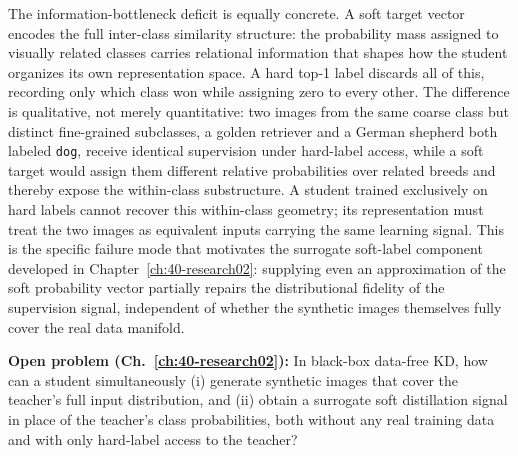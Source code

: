 \begin{foldable}
  The information-bottleneck deficit is equally concrete.
  A soft target vector encodes the full inter-class similarity structure: the probability mass assigned to visually related classes carries relational information that shapes how the student organizes its own representation space.
  A hard top-1 label discards all of this, recording only which class won while assigning zero to every other.
  The difference is qualitative, not merely quantitative: two images from the same coarse class but distinct fine-grained subclasses, a golden retriever and a German shepherd both labeled \texttt{dog}, receive identical supervision under hard-label access, while a soft target would assign them different relative probabilities over related breeds and thereby expose the within-class substructure.
  A student trained exclusively on hard labels cannot recover this within-class geometry; its representation must treat the two images as equivalent inputs carrying the same learning signal.
  This is the specific failure mode that motivates the surrogate soft-label component developed in Chapter~\ref{ch:40-research02}: supplying even an approximation of the soft probability vector partially repairs the distributional fidelity of the supervision signal, independent of whether the synthetic images themselves fully cover the real data manifold.
\end{foldable}

\begin{foldable}
  \textbf{Open problem (Ch.~\ref{ch:40-research02}):}
  In black-box data-free \ac{KD}, how can a student simultaneously (i) generate synthetic images that cover the teacher's full input distribution, and (ii) obtain a surrogate soft distillation signal in place of the teacher's class probabilities, both without any real training data and with only hard-label access to the teacher?
\end{foldable}
